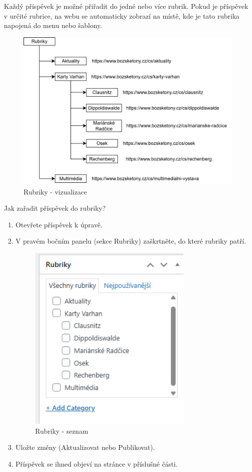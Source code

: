 \documentclass[12pt,a4paper]{article}
\begin{document}
	Každý příspěvek je možné přiřadit do jedné nebo více rubrik. Pokud je příspěvek v určité rubrice, na webu se automaticky zobrazí na místě, kde je tato rubrika napojená do menu nebo šablony.

	\begin{figure}[htp]
		\centering
		\includegraphics[width=15cm]{WPrubriky.png}
		\caption{Rubriky - vizualizace}
		\label{fig:role}
	\end{figure}



	
	Jak zařadit příspěvek do rubriky?
	\begin{enumerate}
		\item Otevřete příspěvek k úpravě.
		\item V pravém bočním panelu (sekce Rubriky) zaškrtněte, do které rubriky patří.
		
		\begin{figure}[htp]
			\centering
			\includegraphics[width=8cm]{WPrubriky2.png}
			\caption{Rubriky - seznam}
			\label{fig:role}
		\end{figure}
		
		\item Uložte změny (Aktualizovat nebo Publikovat).
		\item Příspěvek se ihned objeví na stránce v příslušné části.
	\end{enumerate}
	
\end{document}
